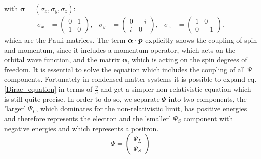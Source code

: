 	with $\boldsymbol{\sigma} = (\sigma_x, \sigma_y, \sigma_z)$:
	\begin{align}
		\sigma_x &=
		 \begin{pmatrix}
		 0 & 1 \\
		 1 & 0
		 \end{pmatrix} ,&
		 \sigma_y &=
		 \begin{pmatrix}
		 0 & -i \\
		 i & 0
		 \end{pmatrix} ,&
		 \sigma_z &=
		 \begin{pmatrix}
		 1 & 0 \\
		 0 & -1
		 \end{pmatrix}.
	\end{align}
	which are the Pauli matrices. The term $\boldsymbol{\alpha} \cdot \boldsymbol{p}$ explicitly shows the coupling of spin and momentum, since it includes a momentum operator, which acts on the orbital wave function, and the matrix $\boldsymbol{\alpha}$, which is acting on the spin degrees of freedom.
%	
	It is essential to solve the equation which includes the coupling of all $\Psi$ components. Fortunately in condensed matter systems it is possible to expand eq.\eqref{Dirac_equation} in terms of $\frac{v}{c}$ and get a simpler non-relativistic equation which is still quite precise.
	In order to do so, we separate $\Psi$ into two components, the 'larger' $\Psi_L$, which dominates for the non-relativistic limit, has positive energies and therefore represents the electron and the 'smaller' $\Psi_S$ component with negative energies and which represents a positron. 
	\begin{equation}
		\Psi = 
		\begin{pmatrix}
			\Psi_L \\ \Psi_S
		\end{pmatrix}
	\end{equation}	
